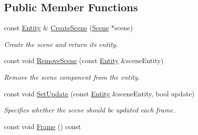\subsection*{Public Member Functions}
\begin{DoxyCompactItemize}
\item 
const \hyperlink{struct_ensum_1_1_components_1_1_entity}{Entity} \& \hyperlink{class_ensum_1_1_components_1_1_scene_manager_a4a71bb9192da118a71f1b81ca49742cb}{Create\+Scene} (\hyperlink{class_ensum_1_1_components_1_1_scene}{Scene} $\ast$scene)\hypertarget{class_ensum_1_1_components_1_1_scene_manager_a4a71bb9192da118a71f1b81ca49742cb}{}\label{class_ensum_1_1_components_1_1_scene_manager_a4a71bb9192da118a71f1b81ca49742cb}

\begin{DoxyCompactList}\small\item\em Create the scene and return it\textquotesingle{}s entity. \end{DoxyCompactList}\item 
const void \hyperlink{class_ensum_1_1_components_1_1_scene_manager_ab970d3716b08c39b9b8c5484dea11595}{Remove\+Scene} (const \hyperlink{struct_ensum_1_1_components_1_1_entity}{Entity} \&scene\+Entity)\hypertarget{class_ensum_1_1_components_1_1_scene_manager_ab970d3716b08c39b9b8c5484dea11595}{}\label{class_ensum_1_1_components_1_1_scene_manager_ab970d3716b08c39b9b8c5484dea11595}

\begin{DoxyCompactList}\small\item\em Remove the scene component from the entity. \end{DoxyCompactList}\item 
const void \hyperlink{class_ensum_1_1_components_1_1_scene_manager_aea9f13488931b4448778e5563685428e}{Set\+Update} (const \hyperlink{struct_ensum_1_1_components_1_1_entity}{Entity} \&scene\+Entity, bool update)\hypertarget{class_ensum_1_1_components_1_1_scene_manager_aea9f13488931b4448778e5563685428e}{}\label{class_ensum_1_1_components_1_1_scene_manager_aea9f13488931b4448778e5563685428e}

\begin{DoxyCompactList}\small\item\em Specifies whether the scene should be updated each frame. \end{DoxyCompactList}\item 
const void \hyperlink{class_ensum_1_1_components_1_1_scene_manager_ab909746d9a5de0620ca9c47f0bc13be6}{Frame} () const \hypertarget{class_ensum_1_1_components_1_1_scene_manager_ab909746d9a5de0620ca9c47f0bc13be6}{}\label{class_ensum_1_1_components_1_1_scene_manager_ab909746d9a5de0620ca9c47f0bc13be6}


\end{DoxyCompactItemize}
